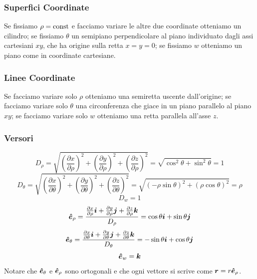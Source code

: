 \subsubsection{Superfici Coordinate}
Se fissiamo $\rho=\text{const}$ e facciamo variare le altre due coordinate otteniamo un cilindro; se fissiamo $\theta$ un semipiano perpendicolare al piano individuato dagli assi cartesiani $xy$, che ha origine sulla retta $x=y=0$; se fissiamo $w$ otteniamo un piano come in coordinate cartesiane.
\subsubsection{Linee Coordinate}
Se facciamo variare solo $\rho$ otteniamo una semiretta uscente dall'origine; se facciamo variare solo $\theta$ una circonferenza che giace in un piano parallelo al piano $xy$; se facciamo variare solo $w$ otteniamo una retta parallela all'asse $z$.
\subsubsection{Versori}
\begin{equation*}D_\rho=\sqrt{\left(\frac{\partial x}{\partial\rho}\right)^2+\left(\frac{\partial y}{\partial \rho}\right)^2+\left(\frac{\partial z}{\partial \rho}\right)^2}=\sqrt{\cos^2\theta+\sin^2\theta}=1\end{equation*}
\begin{equation*}D_\theta=\sqrt{\left(\frac{\partial x}{\partial\theta}\right)^2+\left(\frac{\partial y}{\partial \theta}\right)^2+\left(\frac{\partial z}{\partial \theta}\right)^2}=\sqrt{\left(-\rho\sin\theta\right)^2+\left(\rho\cos\theta\right)^2}=\rho\end{equation*}
\begin{equation*}D_w=1\end{equation*}
\begin{equation*}\boldsymbol{\hat {e}}_\rho=\frac{\frac{\partial x}{\partial\rho}\boldsymbol{i}+\frac{\partial y}{\partial\rho}\boldsymbol{j}+\frac{\partial z}{\partial\rho}\boldsymbol{k}}{D_\rho}=\cos\theta\boldsymbol{i}+\sin\theta\boldsymbol{j}\end{equation*}
\begin{equation*}\boldsymbol{\hat {e}}_\theta=\frac{\frac{\partial x}{\partial\theta}\boldsymbol{i}+\frac{\partial y}{\partial\theta}\boldsymbol{j}+\frac{\partial z}{\partial\theta}\boldsymbol{k}}{D_\theta}=-\sin\theta\boldsymbol{i}+\cos\theta\boldsymbol{j}\end{equation*}
\begin{equation*}\boldsymbol{\hat {e}}_w=\boldsymbol{k}\end{equation*}
Notare che $\boldsymbol{\hat {e}}_\theta$ e $\boldsymbol{\hat {e}}_\rho$ sono ortogonali e che ogni vettore si scrive come $\boldsymbol{r}=r\boldsymbol{\hat {e}}_\rho$.
